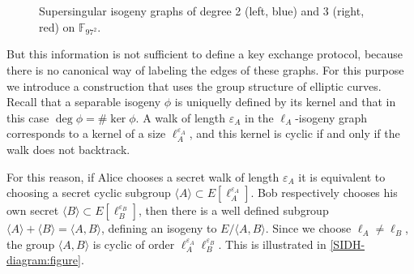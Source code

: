 \documentclass{article}
\theoremstyle{theorem}
\theoremstyle{definition}
\begin{document}
\begin{figure}[h]
	\centering
	\caption{Supersingular isogeny graphs of degree 2 (left, blue) and 3
		(right, red) on $\mathbb{F}_{97^2}$.}
	\label{SIG97-2-3:figure}
\end{figure}

But this information is not sufficient to define a key exchange protocol, because there is no canonical way of labeling the edges of these graphs. For this purpose we introduce a construction that uses the group structure of elliptic curves. Recall that a separable isogeny $\phi$ is uniquelly defined by its kernel and that in this case $\deg\phi = \#\ker\phi$. A walk of length $\varepsilon_A$ in the $\ell_A$-isogeny graph corresponds to a kernel of a size $\ell_A^{\varepsilon_A}$, and this kernel is cyclic if and only if the walk does not backtrack.

For this reason, if Alice chooses a secret walk of length $\varepsilon_A$ it is equivalent to choosing a secret cyclic subgroup $\langle A \rangle \subset E[\ell_A^{\varepsilon_A}]$. Bob respectively chooses his own secret $\langle B \rangle \subset E[\ell_B^{\varepsilon_B}]$, then there is a well defined subgroup $\langle A \rangle + \langle B \rangle = \langle A, B \rangle$, defining an isogeny to $E/\langle A, B \rangle$. Since we choose $\ell_A \neq \ell_B$, the group $\langle A, B \rangle$ is cyclic of order $\ell_A^{\varepsilon_A} \ell_B^{\varepsilon_B}$. This is illustrated in \cref{SIDH-diagram:figure}.
\end{document}
